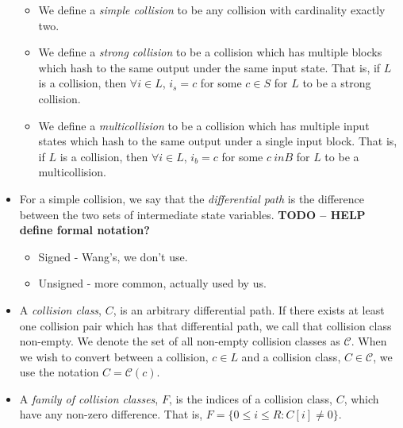 \documentclass[conference]{IEEEtran}
\begin{document}
\begin{itemize}
        \begin{itemize}
            \item We define a \textit{simple collision} to be any collision
                with cardinality exactly two.

            \item We define a \textit{strong collision} to be a collision which
                has multiple blocks which hash to the same output under the same
                input  state. That is, if $L$ is a collision, then
                $\forall i \in L$, $i_s = c$ for some $c \in S$ for $L$ to be
                a strong collision.

            \item We define a \textit{multicollision} to be a collision which
                has multiple input states which hash to the same output under
                a single input block. That is, if $L$ is a collision, then
                $\forall i \in L$, $i_b = c$ for some $c \ in B$ for $L$ to be
                a multicollision.
        \end{itemize}

    \item For a simple collision, we say that the \textit{differential path}
        is the difference between the two sets of intermediate state
        variables. \textbf{TODO -- HELP define formal notation?}
            \begin{itemize}
                \item Signed - Wang's, we don't use.
                \item Unsigned - more common, actually used by us.
            \end{itemize}


    \item A \textit{collision class}, $C$, is an arbitrary differential path.
        If there exists at least one collision pair which has that differential
        path, we call that collision class non-empty. We denote the set of all
        non-empty collision classes as $\mathcal{C}$. When we wish to convert
        between a collision, $c \in L$ and a collision class,
        $C \in \mathcal{C}$, we use the notation $C = \mathcal{C}(c)$.

    \item A \textit{family of collision classes}, $F$, is the indices of a
        collision class, $C$, which have any non-zero difference. That is,
        $F = \{ 0 \leq i \leq R : C[i] \neq 0 \}$.
\end{itemize}
\end{document}
